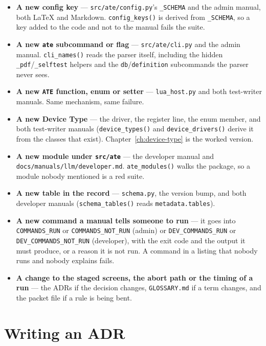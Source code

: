 \begin{itemize}
  \item \textbf{A new config key} --- \texttt{src/ate/config.py}'s \texttt{\_SCHEMA} and the admin
    manual, both LaTeX and Markdown. \texttt{config\_keys()} is derived from \texttt{\_SCHEMA}, so a
    key added to the code and not to the manual fails the suite.
  \item \textbf{A new \texttt{ate} subcommand or flag} --- \texttt{src/ate/cli.py} and the admin
    manual. \texttt{cli\_names()} reads the parser itself, including the hidden
    \texttt{\_pdf}/\texttt{\_selftest} helpers and the \texttt{db}/\texttt{definition} subcommands
    the parser never sees.
  \item \textbf{A new \texttt{ATE} function, enum or setter} --- \texttt{lua\_host.py} and both
    test-writer manuals. Same mechanism, same failure.
  \item \textbf{A new Device Type} --- the driver, the register line, the enum member, and both
    test-writer manuals (\texttt{device\_types()} and \texttt{device\_drivers()} derive it from the
    classes that exist). Chapter~\ref{ch:device-type} is the worked version.
  \item \textbf{A new module under \texttt{src/ate}} --- the developer manual and
    \texttt{docs/\allowbreak{}manuals/\allowbreak{}llm/\allowbreak{}developer.md}. \texttt{ate\_modules()} walks the package, so a module
    nobody mentioned is a red suite.
  \item \textbf{A new table in the record} --- \texttt{schema.py}, the version bump, and both
    developer manuals (\texttt{schema\_tables()} reads \texttt{metadata.tables}).
  \item \textbf{A new command a manual tells someone to run} --- it goes into
    \texttt{COMMANDS\_RUN} or \texttt{COMMANDS\_NOT\_RUN} (admin) or \texttt{DEV\_COMMANDS\_RUN} or
    \texttt{DEV\_\allowbreak{}COMMANDS\_\allowbreak{}NOT\_\allowbreak{}RUN} (developer), with the exit code and the output it must produce,
    or a reason it is not run. A command in a listing that nobody runs and nobody explains fails.
  \item \textbf{A change to the staged screens, the abort path or the timing of a run} --- the ADRs
    if the decision changes, \texttt{GLOSSARY.md} if a term changes, and the packet file if a rule is
    being bent.
\end{itemize}

\section{Writing an ADR}

